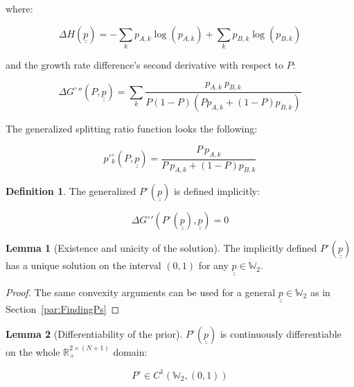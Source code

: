 \documentclass{article}
\theoremstyle{definition}
\newtheorem{definition}{Definition}[section]
\newtheorem{lemma}{Lemma}[section]
\begin{document}
where:

\begin{equation}
    \Delta H(\underline{\underline{p}}) = - \sum_k p_{A,k} \log(p_{A,k}) + 
    \sum_k p_{B,k} \log(p_{B,k})
\end{equation}

and the growth rate difference's second derivative with respect to $P$:

\begin{equation}
    \Delta G^\circ{}''(P,\underline{\underline{p}}) = \sum_k  \frac{p_{A,k} \ p_{B,k}}{P(1-P)(P p_{A,k} + (1-P) p_{B,k})}
\end{equation}

The generalized splitting ratio function looks the following:

\begin{equation}
    p'^\circ_k(P,\underline{\underline{p}}) = \frac{P \ p_{A,k}}{P \ p_{A,k}+(1-P) p_{B,k}}
\end{equation}

\begin{definition}
    The generalized $P^\circ(\underline{\underline{p}})$ is defined implicitly:

    \begin{equation}
        \Delta G^\circ{}'(P^\circ(\underline{\underline{p}}),\underline{\underline{p}}) = 0
    \end{equation}
    
\end{definition}

\begin{lemma}[Existence and unicity of the solution]
    The implicitly defined $P^\circ(\underline{\underline{p}})$ has a unique solution on the interval $(0,1)$ for any $\underline{\underline{p}} \in \mathbb{W}_2$.
    
\end{lemma}

\begin{proof}
    The same convexity arguments can be used for a general $\underline{\underline{p}} \in \mathbb{W}_2$ as in Section~\ref{par:FindingPs}
    
\end{proof}

\begin{lemma}[Differentiability of the prior]
    \label{lemma:DiffP}
    $P^\circ(\underline{\underline{p}})$ is continuously differentiable on the whole $\mathbb{R}_+^{2 \times (N+1)}$ domain:

    \begin{equation}
        P^\circ \in C^1(\mathbb{W}_2,(0,1))
    \end{equation}
    
\end{lemma}
\end{document}
